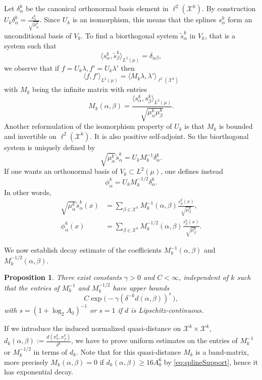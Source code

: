 \documentclass{amsart}
\numberwithin{equation}{section}
\theoremstyle{plain}
\newtheorem{proposition}[equation]{Proposition}
\theoremstyle{definition}
\theoremstyle{remark}
\begin{document}
{{Let $\delta ^k_{\alpha}$ be the canonical orthonormal basis element  in $\ell^2(\mathscr{X}^{k})$. By construction  $U_{k}\delta ^k_{\alpha}= \frac{s^k_{\alpha}}{\sqrt {\mu^k_{\alpha}}}$. Since $U_{k}$ is an isomorphism, this means that the splines $s^k_{\alpha}$ form an unconditional basis of $V_{k}$. To find 
a biorthogonal system $\tilde s^k_{\alpha}$ in $V_{k}$, that is a system such that 
$$
\langle s^k_{\alpha}, \tilde s^k_{\beta}\rangle_{L^2(\mu)}= \delta _{\alpha\beta},
$$ we observe that if 
 $f=U_{k}\lambda, f'=U_{k}\lambda'$ then
\[
\langle f, f'\rangle_{L^2(\mu)}= \langle M_{k}\lambda, \lambda'\rangle_{\ell^2(\mathscr{X}^{k})}
\]
with $M_{k}$ being the infinite matrix with entries
$$
M_{k}(\alpha,\beta)=\frac{\langle s^k_{\alpha}, s^k_{\beta}\rangle_{L^2(\mu)}}{\sqrt{\mu^k_{\alpha}\mu^k_{\beta}}}.
$$
Another reformulation of the isomorphism property of $U_{k}$ is that $M_{k}$ is bounded and invertible on $\ell^2(\mathscr{X}^{k})$. It is also positive self-adjoint. So the biorthogonal system is uniquely defined by
$$
\sqrt{\mu^k_{\alpha}}\tilde s^k_{\alpha} = U_{k}M_{k}^{-1}\delta ^k_{\alpha}.
$$
If one wants an orthonormal basis of $V_{k} \subset L^2(\mu)$, one defines instead
$$
\phi^k_{\alpha}=U_{k}M_{k}^{-1/2} \delta ^k_{\alpha}.
$$
In other words,
\begin{equation*}
\begin{split}
\sqrt{\mu^k_{\alpha}}\tilde s^k_{\alpha}(x) &= \sum_{\beta\in \mathscr{X}^{k}} M_{k}^{-1} (\alpha,\beta)  \frac{s^k_{\beta}(x)}{\sqrt{\mu^k_{\beta}}}, \\
\phi^k_{\alpha}(x) &= \sum_{\beta \in \mathscr{X}^{k}} M_{k}^{-1/2} (\alpha,\beta)  \frac{s^k_{\beta}(x)}{\sqrt{\mu^k_{\beta}}}.
\end{split}
\end{equation*} 

We now establish decay estimate of the coefficients $M_k^{-1}(\alpha,\beta)$ and $M_k^{-1/2}(\alpha,\beta)$.
 

\begin{proposition}\label{prop:matrices}
There exist constants $\gamma>0$ and $C<\infty$, independent of $k$ such that the entries of $M_{k}^{-1}$ and $M_{k}^{-1/2}$ have upper bounds
$$
C\exp\big(- \gamma (\delta ^{-k}{d(\alpha,\beta)})^{s}\, \big),
$$
with $s=(1+\log_{2}A_{0})^{-1}$ {or $s=1$ if $d$ is Lipschitz-continuous.}
\end{proposition}

If we introduce the induced normalized quasi-distance on $\mathscr{X}^{k}\times \mathscr{X}^{k} $,   $d_{k}(\alpha,\beta):= \frac{d(x^k_{\alpha},x^k_{\beta})}{\delta ^k}$, we have to prove uniform  estimates on the entries of $M_{k}^{-1}$ or $M_{k}^{-1/2}$ in terms of $d_{k}$.  Note that for this quasi-distance $M_{k}$ is a band-matrix, more precisely $M_{k}(\alpha,\beta)= 0$ if $d_{k}(\alpha,\beta) \ge 16A_{0}^6 $ by \eqref{eq:splineSupport}, hence it has exponential decay.  

}}
\end{document}
